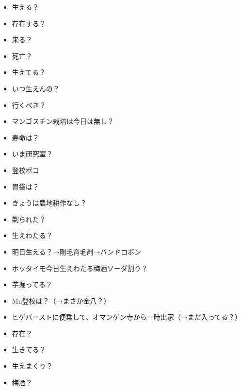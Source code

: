 \begin{itemize}
\item 生える？
\item 存在する？
\item 来る？
\item 死亡？
\item 生えてる？
\item いつ生えんの？
\item 行くべき？
\item マンゴスチン栽培は今日は無し？
\item 寿命は？
\item いま研究室？
\item 登校ポコ
\item 胃袋は？
\item きょうは農地耕作なし？
\item 剃られた？
\item 生えわたる？
\item 明日生える？→剛毛育毛剤→バンドロポン
\item ホッタイモ今日生えわたる梅酒ソーダ割り？
\item 芋掘ってる？
\item Mn登校は？（→まさか金八？）
\item ヒゲバーストに便乗して、オマンゲン寺から一時出家（→まだ入ってる？）
\item 存在？
\item 生きてる？
\item 生えまくり？
\item 梅酒？
\end{itemize}
